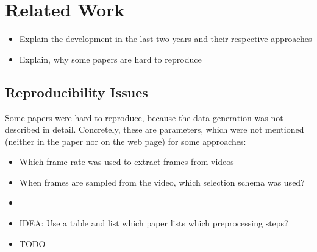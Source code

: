\section{Related Work}
\label{sec:related}

\begin{itemize}
	\item Explain the development in the last two years and their respective approaches
	\item Explain, why some papers are hard to reproduce
\end{itemize}

\subsection{Reproducibility Issues}
Some papers were hard to reproduce, because the data generation was not described in detail.
Concretely, these are parameters, which were not mentioned (neither in the paper nor on the web page) for some approaches:
\begin{itemize}
	\item Which frame rate was used to extract frames from videos
	\item When frames are sampled from the video, which selection schema was used?
	\item
	\item IDEA: Use a table and list which paper lists which preprocessing steps?
	\item TODO
\end{itemize}
